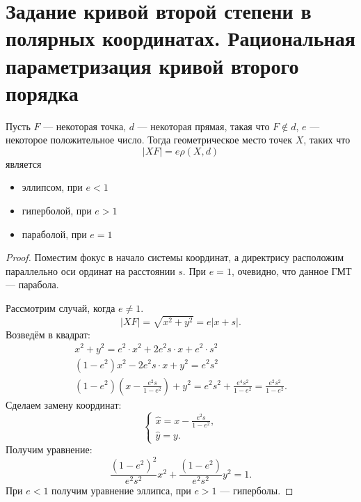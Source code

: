 \section{Задание кривой второй степени в полярных координатах. Рациональная параметризация кривой второго порядка}

\begin{theorem}
    Пусть $F$ --- некоторая точка, $d$ --- некоторая прямая, такая что $F \notin d$, $e$ --- некоторое положительное число. Тогда геометрическое место точек $X$, таких что
    $$
    |XF| = e\rho(X, d)
    $$
    является
    \begin{itemize}
        \item эллипсом, при $e < 1$
        \item гиперболой, при $e > 1$
        \item параболой, при $e = 1$
    \end{itemize}
\end{theorem}

\begin{proof}
    Поместим фокус в начало системы координат, а директрису расположим параллельно оси ординат на расстоянии $s$. При $e = 1$, очевидно, что данное ГМТ --- парабола.

    Рассмотрим случай, когда $e \ne 1$.
    $$
    |XF| = \sqrt{x^2 + y^2} = e|x + s|.
    $$
    Возведём в квадрат:
    $$
    \begin{array}{c}\displaystyle
        x^2 + y^2 = e^2\cdot x^2 + 2e^2s\cdot x + e^2\cdot s^2\\\displaystyle
        (1 - e^2)x^2 - 2e^2s\cdot x + y^2 = e^2s^2\\\displaystyle
        (1 - e^2)\left(x - \frac{e^2s}{1 - e^2}\right) + y^2 = e^2s^2 + \frac{e^4s^2}{1 - e^2} = \frac{e^2s^2}{1 - e^2}.
    \end{array}
    $$
    Сделаем замену координат:
    $$
    \begin{cases}\displaystyle
        \widehat{x} = x - \frac{e^2s}{1 - e^2},\\\displaystyle
        \widehat{y} = y.
    \end{cases}
    $$
    Получим уравнение:
    $$
    \frac{(1 - e^2)^2}{e^2s^2}x^2 + \frac{(1 - e^2)}{e^2s^2}y^2 = 1.
    $$
    При $e < 1$ получим уравнение эллипса, при $e > 1$ --- гиперболы.
\end{proof}

